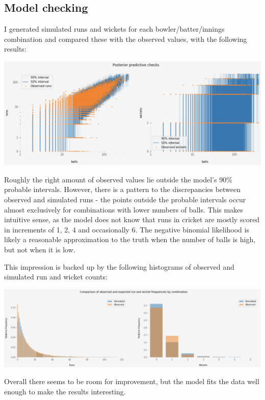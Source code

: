 \documentclass[11pt]{article}
\begin{document}
\subsection*{Model checking}
\label{sec:orge6cf399}
I generated simulated runs and wickets for each bowler/batter/innings
combination and compared these with the observed values, with the following
results:

\begin{center}
\includegraphics[width=.9\linewidth]{images/cricket_ppc.png}
\end{center}

Roughly the right amount of observed values lie outside the model's
90\% probable intervals. However, there is a pattern to the
discrepancies between observed and simulated runs - the points outside
the probable intervals occur almost exclusively for combinations with
lower numbers of balls. This makes intuitive sense, as the model does
not know that runs in cricket are mostly scored in increments of 1, 2,
4 and occasionally 6. The negative binomial likelihood is likely a
reasonable approximation to the truth when the number of balls is
high, but not when it is low.

This impression is backed up by the following histograms of observed
and simulated run and wicket counts:

\begin{center}
\includegraphics[width=.9\linewidth]{images/cricket_histograms.png}
\end{center}

Overall there seems to be room for improvement, but the model fits the
data well enough to make the results interesting.
\end{document}
